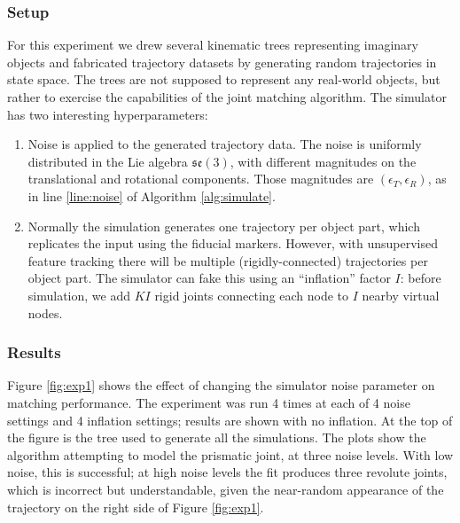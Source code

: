 \documentclass[letterpaper, 10 pt, conference]{ieeeconf}  %
\begin{document}
\subsubsection{Setup}
For this experiment we drew several kinematic trees representing imaginary objects and fabricated trajectory datasets by generating random trajectories in state space. The trees are not supposed to represent any real-world objects, but rather to exercise the capabilities of the joint matching algorithm. The simulator has two interesting hyperparameters:
\begin{enumerate}
  \item Noise is applied to the generated trajectory data. The noise is uniformly distributed in the Lie algebra $\mathfrak{se}(3)$, with different magnitudes on the translational and rotational components. Those magnitudes are $(\epsilon_T, \epsilon_R)$, as in line \ref{line:noise} of Algorithm \ref{alg:simulate}.
  \item Normally the simulation generates one trajectory per object part, which replicates the input using the fiducial markers. However, with unsupervised feature tracking there will be multiple (rigidly-connected) trajectories per object part. The simulator can fake this using an ``inflation'' factor $I$: before simulation, we add $KI$ rigid joints connecting each node to $I$ nearby virtual nodes.
\end{enumerate}

\subsubsection{Results}
Figure \ref{fig:exp1} shows the effect of changing the simulator noise parameter on matching performance. The experiment was run 4 times at each of 4 noise settings and 4 inflation settings; results are shown with no inflation. At the top of the figure is the tree used to generate all the simulations. The plots show the algorithm attempting to model the prismatic joint, at three noise levels. With low noise, this is successful; at high noise levels the fit produces three revolute joints, which is incorrect but understandable, given the near-random appearance of the trajectory on the right side of Figure \ref{fig:exp1}.
\end{document}
